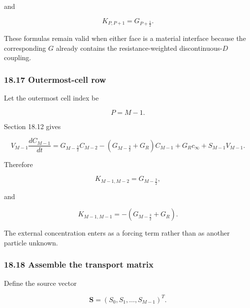 \documentclass[11pt,a4paper]{article}
\begin{document}
and

\begin{equation}
K_{P,P+1}
=
G_{P+\frac12}.
\tag{TRISO-FV-250}
\label{eq:triso-fv-250}
\end{equation}

These formulas remain valid when either face is a material interface because the corresponding $G$ already contains the resistance-weighted discontinuous-$D$ coupling.

\subsubsection*{18.17 Outermost-cell row}

Let the outermost cell index be

\begin{equation}
P=M-1.
\tag{TRISO-FV-251}
\label{eq:triso-fv-251}
\end{equation}

Section 18.12 gives

\begin{equation}
V_{M-1}\frac{dC_{M-1}}{dt}
=
G_{M-\frac32}C_{M-2}
-
\left(
G_{M-\frac32}+G_R
\right)C_{M-1}
+
G_Rc_\infty
+
S_{M-1}V_{M-1}.
\tag{TRISO-FV-252}
\label{eq:triso-fv-252}
\end{equation}

Therefore

\begin{equation}
K_{M-1,M-2}
=
G_{M-\frac32},
\tag{TRISO-FV-253}
\label{eq:triso-fv-253}
\end{equation}

and

\begin{equation}
K_{M-1,M-1}
=
-\left(
G_{M-\frac32}+G_R
\right).
\tag{TRISO-FV-254}
\label{eq:triso-fv-254}
\end{equation}

The external concentration enters as a forcing term rather than as another particle unknown.

\subsubsection*{18.18 Assemble the transport matrix}

Define the source vector

\begin{equation}
\mathbf S
=
(S_0,S_1,\ldots,S_{M-1})^T.
\tag{TRISO-FV-255}
\label{eq:triso-fv-255}
\end{equation}
\end{document}
